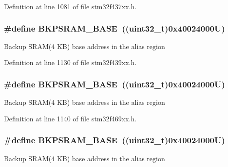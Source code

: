 Definition at line 1081 of file stm32f437xx.\+h.

\subsubsection[{\texorpdfstring{B\+K\+P\+S\+R\+A\+M\+\_\+\+B\+A\+SE}{BKPSRAM_BASE}}]{\setlength{\rightskip}{0pt plus 5cm}\#define B\+K\+P\+S\+R\+A\+M\+\_\+\+B\+A\+SE~((uint32\+\_\+t)0x40024000\+U)}\hypertarget{group___peripheral__memory__map_ga52e57051bdf8909222b36e5408a48f32}{}\label{group___peripheral__memory__map_ga52e57051bdf8909222b36e5408a48f32}
Backup S\+R\+A\+M(4 K\+B) base address in the alias region 

Definition at line 1130 of file stm32f439xx.\+h.

\subsubsection[{\texorpdfstring{B\+K\+P\+S\+R\+A\+M\+\_\+\+B\+A\+SE}{BKPSRAM_BASE}}]{\setlength{\rightskip}{0pt plus 5cm}\#define B\+K\+P\+S\+R\+A\+M\+\_\+\+B\+A\+SE~((uint32\+\_\+t)0x40024000\+U)}\hypertarget{group___peripheral__memory__map_ga52e57051bdf8909222b36e5408a48f32}{}\label{group___peripheral__memory__map_ga52e57051bdf8909222b36e5408a48f32}
Backup S\+R\+A\+M(4 K\+B) base address in the alias region 

Definition at line 1140 of file stm32f469xx.\+h.

\subsubsection[{\texorpdfstring{B\+K\+P\+S\+R\+A\+M\+\_\+\+B\+A\+SE}{BKPSRAM_BASE}}]{\setlength{\rightskip}{0pt plus 5cm}\#define B\+K\+P\+S\+R\+A\+M\+\_\+\+B\+A\+SE~((uint32\+\_\+t)0x40024000\+U)}\hypertarget{group___peripheral__memory__map_ga52e57051bdf8909222b36e5408a48f32}{}\label{group___peripheral__memory__map_ga52e57051bdf8909222b36e5408a48f32}
Backup S\+R\+A\+M(4 K\+B) base address in the alias region 

